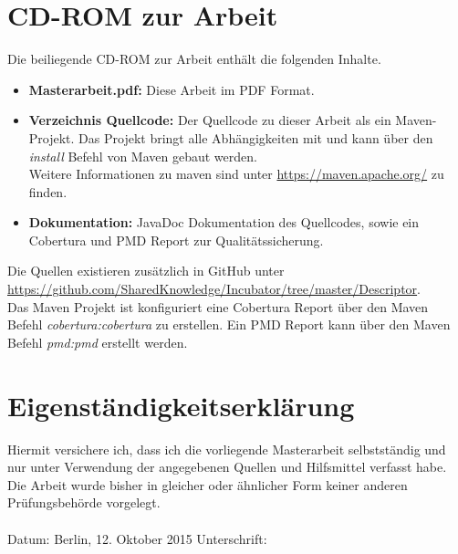 \documentclass[a4paper]{article}
\begin{document}
	\newpage	
	\begin{appendix}
	
	\section{CD-ROM zur Arbeit}
	\label{sec:CD}
	
	Die beiliegende CD-ROM zur Arbeit enthält die folgenden Inhalte.
	
	\begin{itemize}
		\item \textbf{Masterarbeit.pdf:} Diese Arbeit im PDF Format.
		\item \textbf{Verzeichnis Quellcode:} Der Quellcode zu dieser Arbeit
		als ein Maven-Projekt. Das Projekt bringt alle Abhängigkeiten mit
		und kann über den \emph{install} Befehl von Maven gebaut werden. \\
		Weitere Informationen zu maven sind unter \url{https://maven.apache.org/}
		zu finden.
		\item \textbf{Dokumentation:} JavaDoc Dokumentation des Quellcodes, sowie
		ein Cobertura und PMD Report zur Qualitätssicherung. 
	\end{itemize} 
	
	Die Quellen existieren zusätzlich in GitHub unter 
	\url{https://github.com/SharedKnowledge/Incubator/tree/master/Descriptor}. \\
	
	Das Maven Projekt ist konfiguriert eine Cobertura Report über den Maven Befehl 
	\emph{cobertura:cobertura} zu erstellen. Ein PMD Report kann über den Maven
	Befehl \emph{pmd:pmd} erstellt werden.
	

	\newpage	
  	\section{Eigenständigkeitserklärung}
  	Hiermit versichere ich, dass ich die vorliegende Masterarbeit selbstständig und
  	nur unter Verwendung der angegebenen Quellen und Hilfsmittel verfasst habe. Die
  	Arbeit wurde bisher in gleicher oder ähnlicher Form keiner anderen
  	Prüfungsbehörde vorgelegt. \\ \\
  	
 	Datum: \hspace{10pt} Berlin, 12. Oktober 2015 \hspace{30pt} Unterschrift:

	\end{appendix}
  	
\end{document}
